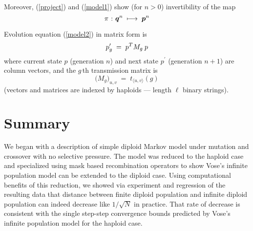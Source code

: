Moreover, (\ref{project}) and (\ref{model1}) show (for $n > 0$) invertibility of the map
\[
  \pi \hspace{0.01in} : \hspace{0.01in} {\bm q}^{n} \; \longmapsto \; {\bm p}^{n}
\]

Evolution equation (\ref{model2}) in matrix form is
\begin{equation}
\label{model3}
p_g^\prime \; = \; p^T M_g \,\hspace{0.01in} p
\end{equation}
where current state $p$ (generation $n$) and next state $p^\prime$
(generation $n+1$) are column vectors, and the $g\,$th transmission
matrix is
\begin{equation} \label{Mg}
\Big(M_g \Big)_{u,v} \; = \; t_{\langle u, v \rangle}(g)
\end{equation}
(vectors and matrices are indexed by haploids --- length $\ell$ binary
strings).





\section{Summary}
We began with a description of simple diploid Markov model under mutation 
and crossover with no selective pressure. The model was reduced to the haploid case and specialized 
using mask based recombination operators to show Vose's infinite population model 
can be extended to the diploid case. Using computational benefits 
of this reduction, we showed via experiment and 
regression of the resulting data that distance between finite diploid population and infinite 
diploid population can indeed decrease like $1/\sqrt{N}$ in practice. That rate of decrease is consistent with 
the single step-step convergence bounds predicted by 
Vose's infinite population model for the haploid case.

